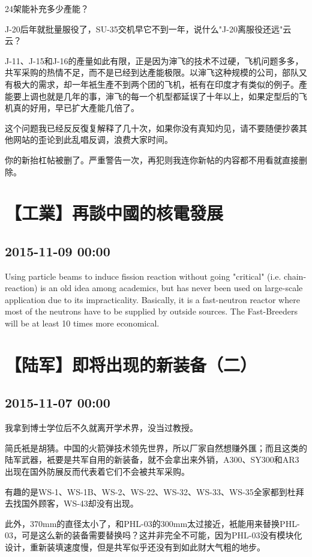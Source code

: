 \documentclass[twocolumn]{ctexart}
\begin{document}
24架能补充多少產能？

J-20后年就批量服役了，SU-35交机早它不到一年，说什么"J-20离服役还远"云云？

J-11、J-15和J-16的產量如此有限，正是因为渖飞的技术不过硬，飞机问题多多，共军采购的热情不足，而不是已经到达產能极限。以渖飞这种规模的公司，部队又有极大的需求，却一年衹生產不到两个团的飞机，衹有在印度才有类似的例子。產能要上调也就是几年的事，渖飞的每一个机型都延误了十年以上，如果定型后的飞机真的好用，早已扩大產能几倍了。

这个问题我已经反反復复解释了几十次，如果你没有真知灼见，请不要随便抄袭其他网站的歪论到此乱唱反调，浪费大家时间。

你的新抬杠帖被删了。严重警告一次，再犯则我连你新帖的内容都不用看就直接删除。\section*{【工業】再談中國的核電發展}
\subsection*{2015-11-09 00:00}
Using particle beams to induce fission reaction without going "critical" (i.e. chain-reaction) is an old idea among academics, but has never been used on large-scale application due to its impracticality. Basically, it is a fast-neutron reactor where most of the neutrons have to be supplied by outside sources. The Fast-Breeders will be at least 10 times more economical.\section*{【陆军】即将出现的新装备（二）}
\subsection*{2015-11-07 00:00}
我拿到博士学位后不久就离开学术界，没当过教授。

简氏衹是胡猜。中国的火箭弹技术领先世界，所以厂家自然想赚外匯；而且这类的陆军武器，衹要是共军自用的新装备，就不会拿出来外销，A300、SY300和AR3出现在国外防展反而代表着它们不会被共军采购。

有趣的是WS-1、WS-1B、WS-2、WS-22、WS-32、WS-33、WS-35全家都到杜拜去找国外顾客，WS-43却没有出现。

此外，370mm的直径太小了，和PHL-03的300mm太过接近，衹能用来替换PHL-03，可是这么新的装备需要替换吗？这并非完全不可能，因为PHL-03没有模块化设计，重新装填速度慢，但是共军似乎还没有到如此财大气粗的地步。
\end{document}
